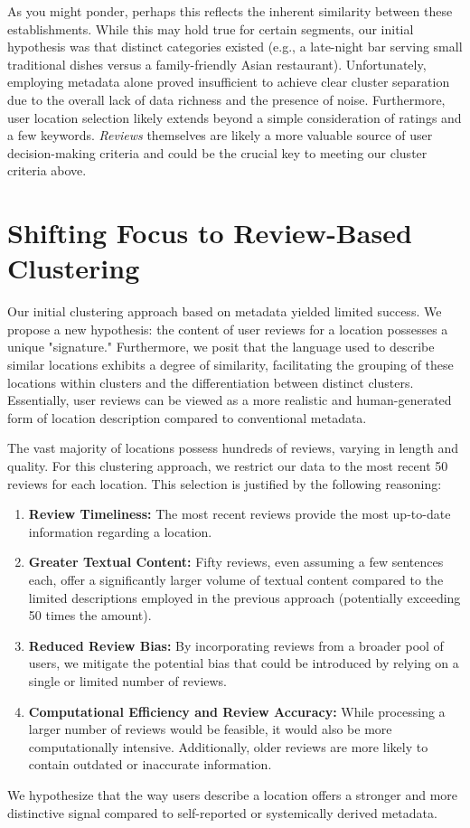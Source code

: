 \documentclass[12pt,a4paper]{report}
\begin{document}
As you might ponder, perhaps this reflects the inherent similarity between these establishments. While this may hold true for certain segments, our initial hypothesis was that distinct categories existed (e.g., a late-night bar serving small traditional dishes versus a family-friendly Asian restaurant).  Unfortunately, employing metadata alone proved insufficient to achieve clear cluster separation due to the overall lack of data richness and the presence of noise.
Furthermore, user location selection likely extends beyond a simple consideration of ratings and a few keywords.  \textit{Reviews} themselves are likely a more valuable source of user decision-making criteria and could be the crucial key to meeting our cluster criteria above.


\section{Shifting Focus to Review-Based Clustering}

Our initial clustering approach based on metadata yielded limited success.  We propose a new hypothesis:  the content of user reviews for a location possesses a unique "signature."  Furthermore, we posit that the language used to describe similar locations exhibits a degree of similarity, facilitating the grouping of these locations within clusters and the differentiation between distinct clusters.  Essentially, user reviews can be viewed as a more realistic and human-generated form of location description compared to conventional metadata.

The vast majority of locations possess hundreds of reviews, varying in length and quality.  For this clustering approach, we restrict our data to the most recent 50 reviews for each location.  This selection is justified by the following reasoning:
\begin{enumerate}
\item{\textbf{Review Timeliness:} The most recent reviews provide the most up-to-date information regarding a location.}
\item{\textbf{Greater Textual Content:} Fifty reviews, even assuming a few sentences each, offer a significantly larger volume of textual content compared to the limited descriptions employed in the previous approach (potentially exceeding 50 times the amount).}
\item{\textbf{Reduced Review Bias:} By incorporating reviews from a broader pool of users, we mitigate the potential bias that could be introduced by relying on a single or limited number of reviews.}
\item{\textbf{Computational Efficiency and Review Accuracy:} While processing a larger number of reviews would be feasible, it would also be more computationally intensive. Additionally, older reviews are more likely to contain outdated or inaccurate information.}
\end{enumerate}
We hypothesize that the way users describe a location offers a stronger and more distinctive signal compared to self-reported or systemically derived metadata.
\end{document}

